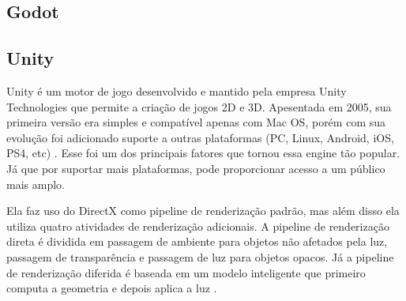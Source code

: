 \begin{figure}[h!]
	\centering
\end{figure}
\nocite{subsurface}

\subsection{Godot}
\label{sec:godot}

\subsection{Unity}
\label{sec:unity}

Unity é um motor de jogo desenvolvido e mantido pela empresa Unity Technologies que permite a criação de jogos 2D e 3D. Apesentada em 2005, sua primeira versão era simples e compatível apenas com Mac OS, porém com sua evolução foi adicionado suporte a outras plataformas (PC, Linux, Android, iOS, PS4, etc) \cite{compStudyGE}. Esse foi um dos principais fatores que tornou essa engine tão popular. Já que por suportar mais plataformas, pode proporcionar acesso a um público mais amplo.

Ela faz uso do DirectX como pipeline de renderização padrão, mas além disso ela utiliza quatro atividades de renderização adicionais. A pipeline de renderização direta é dividida em passagem de ambiente para objetos não afetados pela luz, passagem de transparência e passagem de luz para objetos opacos. Já a pipeline de renderização diferida é baseada em um modelo inteligente que primeiro computa a geometria e depois aplica a luz \cite{simon2015unity}.

